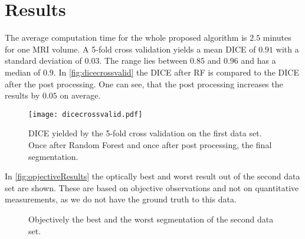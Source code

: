 \section{Results}
The average computation time for the whole proposed algorithm is $2.5$ minutes for one MRI volume. A 5-fold cross validation yields a mean DICE of $0.91$ with a standard deviation of $0.03$. The range lies between $0.85$ and $0.96$ and has a median of $0.9$. In \autoref{fig:dicecrossvalid} the DICE after RF is compared to the DICE after the post processing. One can see, that the post processing increases the results by $0.05$ on average.
\begin{figure}[h]
\centering
\texttt{[image: dicecrossvalid.pdf]}
\caption{DICE yielded by the 5-fold cross validation on the first data set. Once after Random Forest and once after post processing, the final segmentation.}
\label{fig:dicecrossvalid}
\end{figure}

In \autoref{fig:opjectiveResults} the optically best and worst result out of the second data set are shown. These are based on objective observations and not on quantitative measurements, as we do not have the ground truth to this data.
\begin{figure*}[!t]
	\centering
	\hfil
	
	\caption{Objectively the best and the worst segmentation of the second data set.}
	\label{fig:opjectiveResults}
\end{figure*}